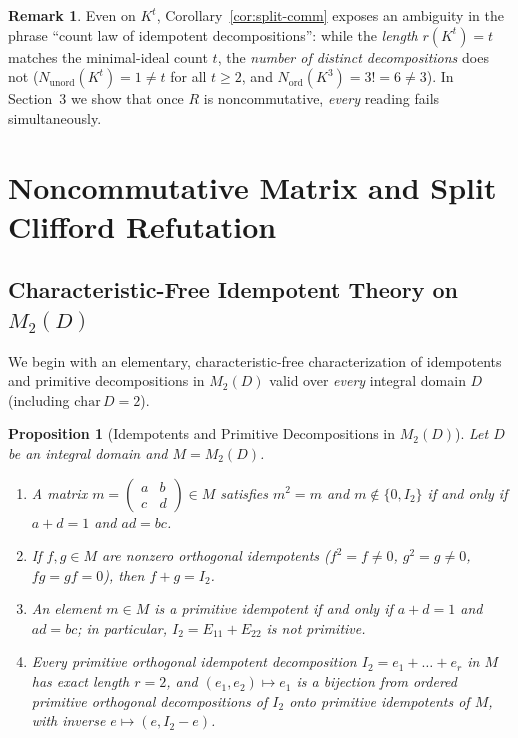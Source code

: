 \documentclass[11pt]{article}
\newtheorem{proposition}[theorem]{Proposition}
\theoremstyle{definition}
\newtheorem{remark}[theorem]{Remark}
\newcommand{\Mat}{M}
\begin{document}
\begin{remark}
Even on $K^t$, Corollary~\ref{cor:split-comm} exposes an ambiguity in the phrase
``count law of idempotent decompositions'': while the \emph{length} $r(K^t) = t$
matches the minimal-ideal count $t$, the \emph{number of distinct decompositions}
does not ($N_{\mathrm{unord}}(K^t) = 1 \neq t$ for all $t \ge 2$, and
$N_{\mathrm{ord}}(K^3) = 3! = 6 \neq 3$). In Section~3 we show that once $R$ is
noncommutative, \emph{every} reading fails simultaneously.
\end{remark}

\section{Noncommutative Matrix and Split Clifford Refutation}

\subsection{Characteristic-Free Idempotent Theory on \texorpdfstring{$\Mat_2(D)$}{M\_2(D)}}

We begin with an elementary, characteristic-free characterization of idempotents
and primitive decompositions in $\Mat_2(D)$ valid over \emph{every} integral
domain $D$ (including $\mathrm{char}\,D = 2$).

\begin{proposition}[Idempotents and Primitive Decompositions in $\Mat_2(D)$]
\label{prop:mat2-domain}
Let $D$ be an integral domain and $M = \Mat_2(D)$.
\begin{enumerate}
\item[(a)] A matrix $m = \begin{pmatrix} a & b \\ c & d \end{pmatrix} \in M$ satisfies
$m^2 = m$ and $m \notin \{0, I_2\}$ if and only if $a + d = 1$ and $ad = bc$.
\item[(b)] If $f, g \in M$ are nonzero orthogonal idempotents ($f^2 = f \neq 0$,
$g^2 = g \neq 0$, $fg = gf = 0$), then $f + g = I_2$.
\item[(c)] An element $m \in M$ is a primitive idempotent if and only if
$a + d = 1$ and $ad = bc$; in particular, $I_2 = E_{11} + E_{22}$ is not
primitive.
\item[(d)] Every primitive orthogonal idempotent decomposition $I_2 = e_1 + \dots + e_r$
in $M$ has exact length $r = 2$, and $(e_1, e_2) \mapsto e_1$ is a bijection
from ordered primitive orthogonal decompositions of $I_2$ onto primitive
idempotents of $M$, with inverse $e \mapsto (e, I_2 - e)$.
\end{enumerate}
\end{proposition}
\end{document}

